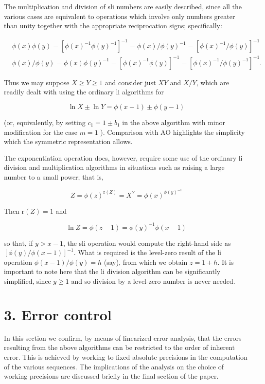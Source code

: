 \documentclass[10pt]{article}
\begin{document}
The multiplication and division of sli numbers are easily described, since all the various cases are equivalent to operations which involve only numbers greater than unity together with the appropriate reciprocation signs; specifically:

$$
\begin{aligned}
& \phi(x) \phi(y)=\left[\phi(x)^{-1} \phi(y)^{-1}\right]^{-1}=\phi(x) / \phi(y)^{-1}=\left[\phi(x)^{-1} / \phi(y)\right]^{-1} \\
& \phi(x) / \phi(y)=\phi(x) \phi(y)^{-1}=\left[\phi(x)^{-1} \phi(y)\right]^{-1}=\left[\phi(x)^{-1} / \phi(y)^{-1}\right]^{-1} .
\end{aligned}
$$

Thus we may suppose $X \geqslant Y \geqslant 1$ and consider just $X Y$ and $X / Y$, which are readily dealt with using the ordinary li algorithms for

$$
\ln X \pm \ln Y=\phi(x-1) \pm \phi(y-1)
$$

(or, equivalently, by setting $c_{1}=1 \pm b_{1}$ in the above algorithm with minor modification for the case $m=1$ ). Comparison with AO highlights the simplicity which the symmetric representation allows.

The exponentiation operation does, however, require some use of the ordinary li division and multiplication algorithms in situations such as raising a large number to a small power; that is,

$$
Z=\phi(z)^{\mathrm{r}(Z)}=X^{Y}=\phi(x)^{\phi(y)^{-1}}
$$

Then $\mathrm{r}(Z)=1$ and

$$
\ln Z=\phi(z-1)=\phi(y)^{-1} \phi(x-1)
$$

so that, if $y>x-1$, the sli operation would compute the right-hand side as $[\phi(y) / \phi(x-1)]^{-1}$. What is required is the level-zero result of the li operation $\phi(x-1) / \phi(y)=h$ (say), from which we obtain $z=1+h$. It is important to note here that the li division algorithm can be significantly simplified, since $y \geqslant 1$ and so division by a level-zero number is never needed.

\section*{3. Error control}
In this section we confirm, by means of linearized error analysis, that the errors resulting from the above algorithms can be restricted to the order of inherent error. This is achieved by working to fixed absolute precisions in the computation of the various sequences. The implications of the analysis on the choice of working precisions are discussed briefly in the final section of the paper.
\end{document}
